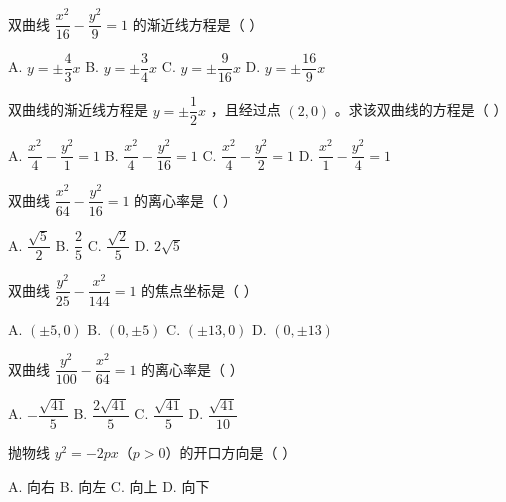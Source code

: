 \documentclass[11pt, a4paper]{article}
\begin{document}
\begin{baitap}[6]
双曲线 $\dfrac{x^2}{16} - \dfrac{y^2}{9} = 1$ 的渐近线方程是（ ）
\par\vspace{3pt}
\noindent A. $y = \pm\dfrac{4}{3}x$ \quad B. $y = \pm\dfrac{3}{4}x$ \quad C. $y = \pm\dfrac{9}{16}x$ \quad D. $y = \pm\dfrac{16}{9}x$
\end{baitap}

\begin{baitap}[7]
双曲线的渐近线方程是 $y = \pm\dfrac{1}{2}x$ ，且经过点 $(2,0)$ 。求该双曲线的方程是（ ）
\par\vspace{3pt}
\noindent A. $\dfrac{x^2}{4} - \dfrac{y^2}{1} = 1$ \quad B. $\dfrac{x^2}{4} - \dfrac{y^2}{16} = 1$ \quad C. $\dfrac{x^2}{4} - \dfrac{y^2}{2} = 1$ \quad D. $\dfrac{x^2}{1} - \dfrac{y^2}{4} = 1$
\end{baitap}

\begin{baitap}[8]
双曲线 $\dfrac{x^2}{64} - \dfrac{y^2}{16} = 1$ 的离心率是（ ）
\par\vspace{3pt}
\noindent A. $\dfrac{\sqrt{5}}{2}$ \quad B. $\dfrac{2}{5}$ \quad C. $\dfrac{\sqrt{2}}{5}$ \quad D. $2\sqrt{5}$
\end{baitap}

\begin{baitap}[9]
双曲线 $\dfrac{y^2}{25} - \dfrac{x^2}{144} = 1$ 的焦点坐标是（ ）
\par\vspace{3pt}
\noindent A. $(\pm 5, 0)$ \quad B. $(0, \pm 5)$ \quad C. $(\pm 13, 0)$ \quad D. $(0, \pm 13)$
\end{baitap}

\begin{baitap}[10]
双曲线 $\dfrac{y^2}{100} - \dfrac{x^2}{64} = 1$ 的离心率是（ ）
\par\vspace{3pt}
\noindent A. $-\dfrac{\sqrt{41}}{5}$ \quad B. $\dfrac{2\sqrt{41}}{5}$ \quad C. $\dfrac{\sqrt{41}}{5}$ \quad D. $\dfrac{\sqrt{41}}{10}$
\end{baitap}

\begin{baitap}[11]
抛物线 $y^2 = -2px$（$p > 0$）的开口方向是（ ）
\par\vspace{3pt}
\noindent A. 向右 \quad B. 向左 \quad C. 向上 \quad D. 向下
\end{baitap}
\end{document}
